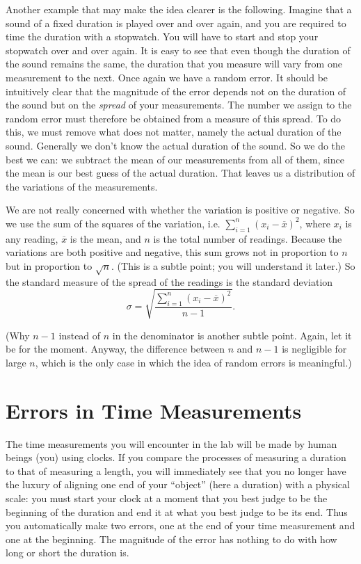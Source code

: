 Another example that may make the idea clearer is the following. Imagine that a sound of a fixed duration is played over and over again, and you are required to time the duration with a stopwatch. You will have to start and stop your stopwatch over and over again. It is easy to see that even though the duration of the sound remains the same, the duration that you measure will vary from one measurement to the next. Once again we have a random error. It should be intuitively clear that the magnitude of the error depends not on the duration of the sound but on the \textit{spread} of your measurements. The number we assign to the random error must therefore be obtained from a measure of this spread. To do this, we must remove what does not matter, namely the actual duration of the sound. Generally we don't know the actual duration of the sound. So we do the best we can: we subtract the mean of our measurements from all of them, since the mean is our best guess of the actual duration. That leaves us a distribution of the variations of the measurements. 

We are not really concerned with whether the variation is positive or negative. So we use the sum of the squares of the variation, i.e. $\sum_{i = 1}^{n}(x_i - \overline{x})^2$, where $x_i$ is any reading, $\overline{x}$ is the mean, and $n$ is the total number of readings. Because the variations are both positive and negative, this sum grows not in proportion to $n$ but in proportion to $\sqrt{n}$. (This is a subtle point; you will understand it later.) So the standard measure of the spread of the readings is the standard deviation 
\begin{equation*}
    \sigma = \sqrt{\frac{\sum_{i = 1}^{n}(x_i - \overline{x})^2}{n - 1}}.
\end{equation*}

(Why $n-1$ instead of $n$ in the denominator is another subtle point. Again, let it be for the moment. Anyway, the difference between $n$ and $n-1$ is negligible for large $n$, which is the only case in which the idea of random errors is meaningful.)

\section{Errors in Time Measurements}

The time measurements you will encounter in the lab will be made by human beings (you) using clocks. If you compare the processes of measuring a duration to that of measuring a length, you will immediately see that you no longer have the luxury of aligning one end of your ``object'' (here a duration) with a physical scale: you must start your clock at a moment that you best judge to be the beginning of the duration and end it at what you best judge to be its end. Thus you automatically make two errors, one at the end of your time measurement and one at the beginning. The magnitude of the error has nothing to do with how long or short the duration is. 

